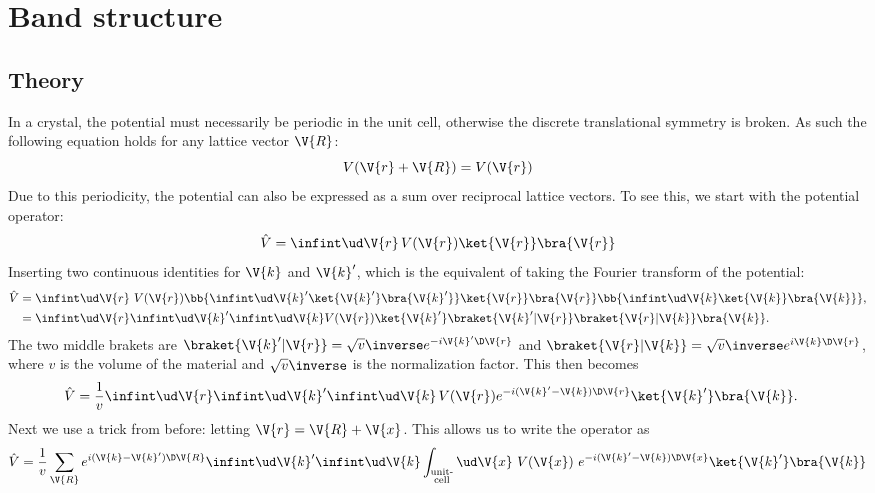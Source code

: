 \documentclass[main.tex]{subfiles}
\begin{document}
	
	\section{Band structure}\label{seq:band_structure}
	\subsection{Theory}
	In a crystal, the potential must necessarily be periodic in the unit cell, otherwise the discrete translational symmetry is broken. As such the following equation holds for any lattice vector $ \V{R} $:
	\begin{equation}\label{eq:band_period_V}
		V(\V{r}+\V{R}) = V(\V{r})
	\end{equation}
	Due to this periodicity, the potential can also be expressed as a sum over reciprocal lattice vectors. To see this, we start with the potential operator:
	\begin{equation}
		\hat{V} = \infint \ud \V{r} \, V(\V{r}) \ket{\V{r}}\bra{\V{r}}
	\end{equation}
	Inserting two continuous identities for $ \V{k} $ and $ \V{k}' $, which is the equivalent of taking the Fourier transform of the potential: 
	\begin{align}
		\hat{V} &= \infint \ud \V{r}\ V(\V{r}) \bb{\infint \ud \V{k}' \ket{\V{k}'} \bra{\V{k}'}} \ket{\V{r}}\bra{\V{r}} \bb{\infint \ud \V{k} \ket{\V{k}} \bra{\V{k}}}, \\
		&= \infint \ud\V{r} \infint \ud \V{k}' \infint \ud \V{k} V(\V{r}) \ket{\V{k}'} \braket{\V{k}' | \V{r}} \braket{\V{r} | \V{k}} \bra{\V{k}}.
	\end{align}
	The two middle brakets are $ \braket{\V{k}'| \V{r}}= \sqrt{v}\inverse e^{-i \V{k}' \D \V{r}} $ and $ \braket{\V{r} | \V{k}} = \sqrt{v}\inverse e^{i \V{k} \D \V{r}} $,  where $ v $ is the volume of the material and $ \sqrt{v}\inverse $ is the normalization factor. This then becomes
	\begin{align}
		\hat{V} &= \frac{1}{v} \infint \ud\V{r} \infint \ud \V{k}' \infint \ud \V{k}\, V(\V{r}) e^{-i(\V{k}'-\V{k}) \D \V{r}} \ket{\V{k}'} \bra{\V{k}}.
	\end{align}
	Next we use a trick from before: letting $ \V{r} = \V{R} + \V{x} $. This allows us to write the operator as
	\begin{equation}
		\hat{V} = \frac{1}{v} \sum_{\V{R}} e^{i(\V{k}-\V{k}') \D \V{R}} \infint \ud \V{k}' \infint \ud \V{k} \int_{\substack{\text{unit-} \\\text{cell}}} \ud \V{x}\ V(\V{x})\  e^{-i (\V{k}'-\V{k}) \D \V{x}} \ket{\V{k}'} \bra{\V{k}}
	\end{equation}
\end{document}
